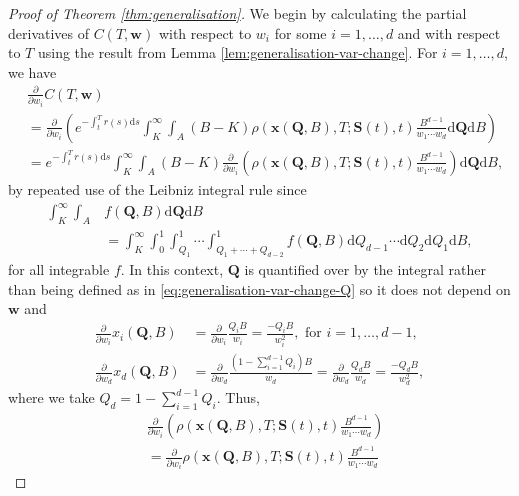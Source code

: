 \documentclass[english]{article}
\numberwithin{equation}{section}
\numberwithin{figure}{section}
\theoremstyle{bolddescit}
\theoremstyle{definition}
\theoremstyle{definition}
\theoremstyle{plain}
\theoremstyle{plain}
\theoremstyle{bolddesc}
\theoremstyle{plain}
\theoremstyle{remark}
\begin{document}
\begin{proof}[Proof of Theorem \ref{thm:generalisation}]
  We begin by calculating the partial derivatives of $C(T,\mathbf{w})$ with respect to $w_i$ for some $i=1,\ldots,d$ and with respect to $T$ using the result from Lemma \ref{lem:generalisation-var-change}. For $i=1,\ldots,d$, we have
  \begin{align*}
    &\frac{\partial}{\partial w_i} C(T,\mathbf{w})\\
    &= \frac{\partial}{\partial w_i} \left(e^{-\int_t^T r(s) \mathrm{d}s} \int_K^\infty \int_A \left(B - K\right) \rho(\mathbf{x}(\mathbf{Q},B),T;\mathbf{S}(t),t) \frac{B^{d-1}}{w_1 \cdots w_d} \mathrm{d}\mathbf{Q} \mathrm{d}B\right)\\
    &= e^{-\int_t^T r(s) \mathrm{d}s}\int_K^\infty \int_A \left(B - K\right) \frac{\partial}{\partial w_i} \left(\rho(\mathbf{x}(\mathbf{Q},B),T;\mathbf{S}(t),t) \frac{B^{d-1}}{w_1 \cdots w_d}\right) \mathrm{d}\mathbf{Q} \mathrm{d}B,
  \end{align*}
  by repeated use of the Leibniz integral rule since
  \begin{align*}
    \int_K^\infty \int_A & f(\mathbf{Q},B) \mathrm{d}\mathbf{Q} \mathrm{d}B \\
    &= \int_K^\infty \int_0^1 \int_{Q_1}^1 \cdots \int_{Q_1 + \cdots + Q_{d-2}}^1 f(\mathbf{Q},B) \mathrm{d}Q_{d-1} \cdots \mathrm{d}Q_2 \mathrm{d}Q_1 \mathrm{d}B,
  \end{align*}
  for all integrable $f$. In this context, $\mathbf{Q}$ is quantified over by the integral rather than being defined as in \eqref{eq:generalisation-var-change-Q} so it does not depend on $\mathbf{w}$ and
  \begin{align*}
    \frac{\partial}{\partial w_i} x_i(\mathbf{Q},B)
    &= \frac{\partial}{\partial w_i} \frac{Q_i B}{w_i}
    = \frac{- Q_i B}{w_i^2}, \text{ for } i=1,\ldots,d-1,\\
    \frac{\partial}{\partial w_d} x_d(\mathbf{Q},B)
    &= \frac{\partial}{\partial w_d} \frac{(1 - \sum_{i=1}^{d-1} Q_i) B}{w_d}
    = \frac{\partial}{\partial w_d} \frac{Q_d B}{w_d}
    = \frac{- Q_d B}{w_d^2},
  \end{align*}
  where we take $Q_d = 1 - \sum_{i=1}^{d-1} Q_i$. Thus,
  \begin{align*}
    &\frac{\partial}{\partial w_i} \left(\rho(\mathbf{x}(\mathbf{Q},B),T;\mathbf{S}(t),t) \frac{B^{d-1}}{w_1 \cdots w_d}\right)\\
    &= \frac{\partial}{\partial w_i} \rho(\mathbf{x}(\mathbf{Q},B),T;\mathbf{S}(t),t) \frac{B^{d-1}}{w_1 \cdots w_d}

\end{align*}
\end{proof}
\end{document}
